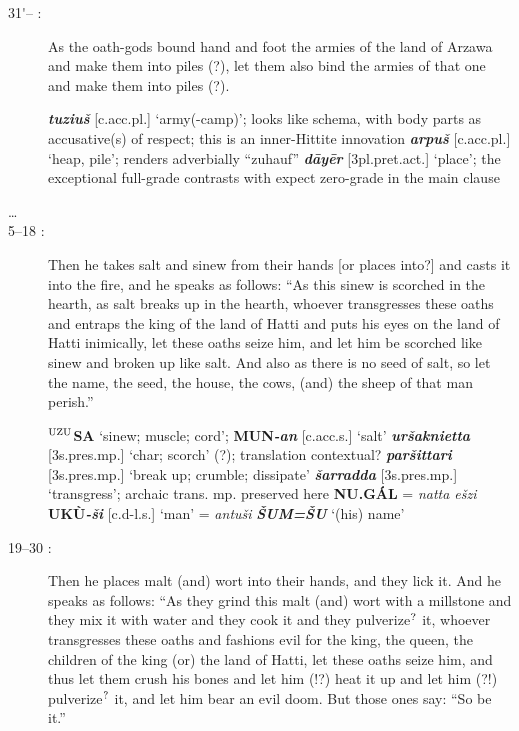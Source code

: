 \documentclass[10pt]{article}
\newcommand{\supersc}[1]{$^{\textrm{\scriptsize{#1}}}$}  	%
\newcommand{\bit}[1]{\textbf{\textit{#1}}}				%
\newcommand{\p}[1]{{\tiny[{#1}]}}					%
\newcommand{\pr}{\'{ }}									%
\newcommand{\hith}{\textsubwedge{h}}
\renewcommand{\.}[1]{\textsubdot{#1}}
\begin{document}
\begin{description}
\begin{notes}
\end{notes}

\item[31{\pr}-- :] As the oath-gods bound hand and foot the armies of the land of Arzawa and make them into piles (?), let them also bind the armies of that one and make them into piles (?).


\begin{notes}

\bit{tuziu\v{s}} \p{c.acc.pl.} `army(-camp)'; looks like schema, with body parts as accusative(s) of respect; this is an inner-Hittite innovation \bit{{\hith}arpu\v{s}} \p{c.acc.pl.} `heap, pile'; \citet[79]{oettinger1976eide} renders adverbially ``zuhauf'' \bit{d\=ay\=er} \p{3pl.pret.act.} `place'; the exceptional full-grade contrasts with expect zero-grade in the main clause

\end{notes}


\item[{\ldots}]


\item[5--18 :] Then he takes salt and sinew from their hands [or places into?] and casts it into the fire, and he speaks as follows: ``As this sinew is scorched in the hearth, as salt breaks up in the hearth, whoever transgresses these oaths and entraps the king of the land of Hatti and puts his eyes on the land of Hatti inimically, let these oaths seize him, and let him be scorched like sinew and broken up like salt. And also as there is no seed of salt, so let the name, the seed, the house, the cows, (and) the sheep of that man perish.''


\begin{notes}

\textbf{\supersc{UZU}SA} `sinew; muscle; cord'; \textbf{MUN}\bit{-an} \p{c.acc.s.} `salt' \bit{{\hith}ur\v{s}aknietta} \p{3s.pres.mp.} `char; scorch' (?); translation contextual? \bit{par\v{s}ittari} \p{3s.pres.mp.} `break up; crumble; dissipate' \bit{\v{s}arradda} \p{3s.pres.mp.} `transgress'; archaic trans. mp. preserved here \textbf{NU.G\'AL} = \textit{natta e\v{s}zi} \textbf{UK\`U}\bit{-\v{s}i} \p{c.d-l.s.} `man' = \textit{antu{\hith}\v{s}i} \bit{\v{S}UM=\v{S}U} `(his) name' 

\end{notes}


\item[19--30 :] Then he places malt (and) wort into their hands, and they lick it. And he speaks as follows: ``As they grind this malt (and) wort with a millstone and they mix it with water and they cook it and they pulverize\supersc{?} it, whoever transgresses these oaths and fashions evil for the king, the queen, the children of the king (or) the land of Hatti, let these oaths seize him, and thus let them crush his bones and let him (!?) heat it up and let him (?!) pulverize\supersc{?} it, and let him bear an evil doom. But those ones say: ``So be it.''




\end{description}
\end{document}
